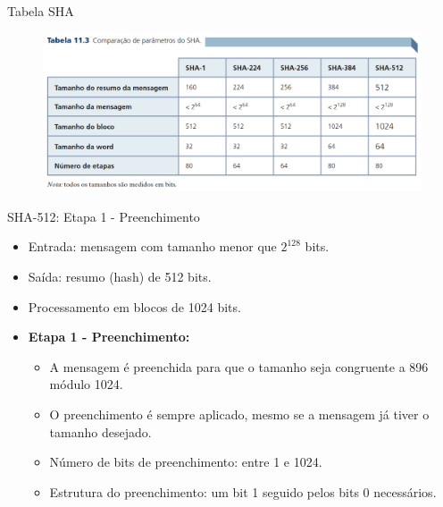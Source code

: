\begin{frame}{Tabela SHA}
\begin{figure}
    \centering
    \includegraphics[width=\linewidth]{Figuras/tabela-sha.png}

\end{figure}
    
\end{frame}

\begin{frame}{SHA-512: Etapa 1 -  Preenchimento}
    \begin{itemize}
        \item Entrada: mensagem com tamanho menor que $2^{128}$ bits.
        \item Saída: resumo (hash) de 512 bits.
        \item Processamento em blocos de 1024 bits.
        \item \textbf{Etapa 1 - Preenchimento:}
        \begin{itemize}
            \item A mensagem é preenchida para que o tamanho seja congruente a 896 módulo 1024.
            \item O preenchimento é sempre aplicado, mesmo se a mensagem já tiver o tamanho desejado.
            \item Número de bits de preenchimento: entre 1 e 1024.
            \item Estrutura do preenchimento: um bit 1 seguido pelos bits 0 necessários.
        \end{itemize}
    \end{itemize}
\end{frame}

